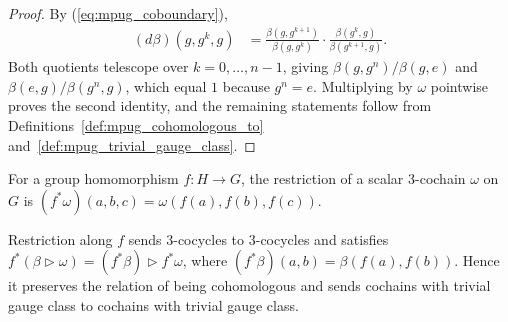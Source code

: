 \begin{proof}\leanok
    By (\ref{eq:mpug_coboundary}),
    \begin{align}
        (d\beta)(g,g^k,g)
         & =\frac{\beta(g,g^{k+1})}{\beta(g,g^k)}\cdot
        \frac{\beta(g^k,g)}{\beta(g^{k+1},g)}.
    \end{align}
    Both quotients telescope over $k=0,\dots,n-1$, giving
    $\beta(g,g^n)/\beta(g,e)$ and $\beta(e,g)/\beta(g^n,g)$, which equal $1$
    because $g^n=e$. Multiplying by $\omega$ pointwise proves the second
    identity, and the remaining statements follow from
    Definitions~\ref{def:mpug_cohomologous_to}
    and~\ref{def:mpug_trivial_gauge_class}.
\end{proof}

\begin{definition}
    \label{def:mpug_cochain_restriction}
    \leanok
    For a group homomorphism $f\colon H\to G$, the restriction of a scalar
    $3$-cochain $\omega$ on $G$ is
    $(f^*\omega)(a,b,c)=\omega(f(a),f(b),f(c))$.
\end{definition}

\begin{lemma}
    \label{thm:mpug_cochain_restriction}
    \leanok
    Restriction along $f$ sends $3$-cocycles to $3$-cocycles and satisfies
    $f^*(\beta\mathbin{\triangleright}\omega)
        =(f^*\beta)\mathbin{\triangleright}f^*\omega$, where
    $(f^*\beta)(a,b)=\beta(f(a),f(b))$. Hence it preserves the relation of
    being cohomologous and sends cochains with trivial gauge class to
    cochains with trivial gauge class.
\end{lemma}

